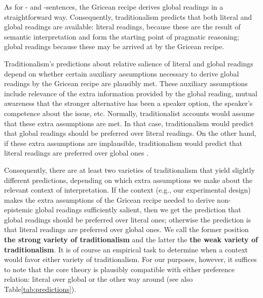 \documentclass[fleqn,reqno,10pt]{article}
\newcommand{\as}{\acro{as}}
\renewcommand{\es}{\acro{es}}
\renewcommand{\mymark}[1]{\textbf{#1}}
\begin{document}
As for \as- and \es-sentences, the Gricean recipe derives global
readings in a straightforward way. Consequently, traditionalism
predicts that both literal and global readings are available:  literal
readings, because these are the result of semantic interpretation
and form the starting point of pragmatic reasoning; global readings
because these may be arrived at by the Gricean recipe.

Traditionalism's predictions about relative salience of literal and
global readings depend on whether certain auxiliary assumptions
necessary to derive global readings by the Gricean recipe are
plausibly met. These auxiliary assumptions include relevance of the
extra information provided by the global reading, mutual awareness
that the stronger alternative has been a speaker option, the speaker's
competence about the issue, etc. Normally, traditionalist accounts
would assume that these extra assumptions are met. In that case,
traditionalism would predict that global readings should be preferred
over literal readings. On the other hand, if these extra assumptions
are implausible, traditionalism would predict that literal readings
are preferred over global ones \citep[see][for experimental evidence
indicating that manipulation of speaker knowledgeability indeed
affects the rate of quantity implicatures drawn by the listener
for unembedded occurrences of \emph{some}]{GoodmanStuhlmuller2013:Knowledge-and-I}.

Consequently, there are at least two varieties of traditionalism that
yield slightly different predictions, depending on which extra
assumptions we make about the relevant context of interpretation. If
the context (e.g., our experimental design) makes the extra
assumptions of the Gricean recipe needed to derive non-epistemic
global readings sufficiently salient, then we get the prediction that
global readings should be preferred over literal ones; otherwise the
prediction is that literal readings are preferred over global ones. We
call the former position \mymark{the strong variety of traditionalism}
and the latter the \mymark{the weak variety of traditionalism}. It is of course an
empirical task to determine when a context would favor either variety
of traditionalism. For our purposes, however, it suffices to note that
the core theory is plausibly compatible with either preference
relation: literal over global or the other way around (see also
Table\ref{tab:predictions}).
\end{document}
